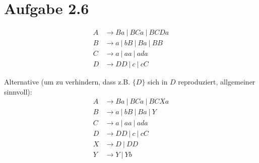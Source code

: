 \documentclass{article}
\begin{document}
\section{Aufgabe 2.6}
\begin{align*}
A &\rightarrow Ba\ |\ BCa\ |\ BCDa \\
B &\rightarrow a\  |\ bB\  |\ Ba\  |\ BB \\ 
C &\rightarrow a\  |\ aa\  |\ ada  \\
D &\rightarrow DD\ |\ c\   |\ cC   
\end{align*}

Alternative (um zu verhindern, dass z.B. $\{D\}$ sich in $D$ reproduziert, allgemeiner sinnvoll):
\begin{align*}
A &\rightarrow Ba\ |\ BCa\ |\ BCXa \\
B &\rightarrow a\  |\ bB\  |\ Ba\  |\ Y \\
C &\rightarrow a\  |\ aa\  |\ ada  \\
D &\rightarrow DD\ |\ c\   |\ cC \\
X &\rightarrow D\ |\ DD \\
Y &\rightarrow Y\ |\ Yb
\end{align*}
\end{document}
